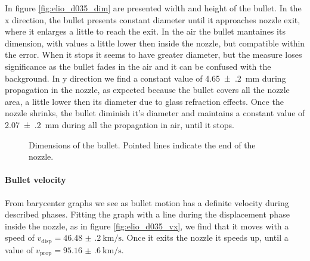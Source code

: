 In figure \ref{fig:elio_d035_dim} are presented width and height of the bullet.
In the x direction, the bullet presents constant diameter until it approaches nozzle exit, where it enlarges a little to reach the exit. In the air the bullet mantaines its dimension, with values a little lower then inside the nozzle, but compatible within the error. When it stops it seems to have greater diameter, but the measure loses significance as the bullet fades in the air and it can be confused with the background.
In y direction we find a constant value of \SI{4.65(20)}{\milli\meter} during propagation in the nozzle, as expected because the bullet covers all the nozzle area, a little lower then its diameter due to glass refraction effects. Once the nozzle shrinks, the bullet diminish it's diameter and maintains a constant value of \SI{2.07(20)}{\milli\meter} during all the propagation in air, until it stops.
\begin{figure}
 \centering
 \hfill
 \caption{Dimensions of the bullet. Pointed lines indicate the end of the nozzle.}
 \label{fig:elio_d035_I}
\end{figure}


\paragraph{Bullet velocity}
From barycenter graphs we see as bullet motion has a definite velocity during described phases.
Fitting the graph with a line during the displacement phase inside the nozzle, as in figure \ref{fig:elio_d035_vx}, we find that it moves with a speed of $v_{\text{disp}} = \SI{46.48(20)}{\kilo\meter/\second}$. Once it exits the nozzle it speeds up, until a value of $v_{\text{prop}} = \SI{95.16(60)}{\kilo\meter/\second}$.


